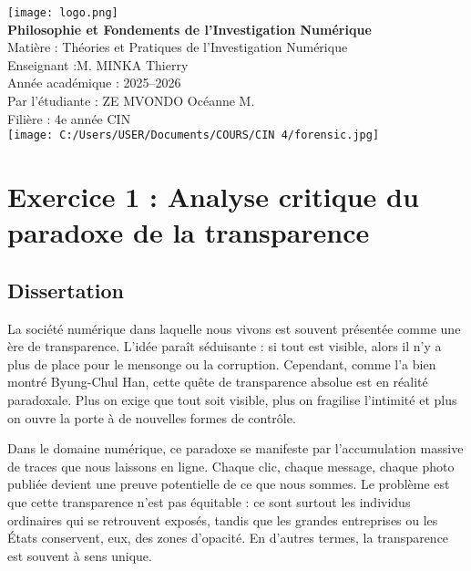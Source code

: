 \documentclass[12pt,a4paper]{report}
\begin{document}
	
	
	\begin{titlepage}
		\centering
		
	
		\texttt{[image: logo.png]}\\[2cm]
		
	
		{\Huge \textbf{Philosophie et Fondements de
				l’Investigation Numérique}}\\[1.5cm]
		
		
		{\Large Matière : Théories et Pratiques de
			l’Investigation Numérique}\\[0.5cm]
		{\Large Enseignant :M. MINKA Thierry}\\[0.5cm]
		{\Large Année académique : 2025--2026}\\[2cm]
		
		
		{\Large  Par l'étudiante : ZE MVONDO Océanne M.}\\[0.5cm]
		{\Large Filière : 4e année CIN }\\[2cm]
		
		
		
	 \texttt{[image: C:/Users/USER/Documents/COURS/CIN 4/forensic.jpg]}\\[4cm]
		
	
	
	\end{titlepage}
	
	
	
	\setlength{\parskip}{1em} 
	\setlength{\parindent}{0pt} 
	
	\section*{Exercice 1 : Analyse critique du paradoxe de la transparence}
	
	\subsection*{Dissertation }
	
	La société numérique dans laquelle nous vivons est souvent présentée comme une ère de 
	transparence. L’idée paraît séduisante : si tout est visible, alors il n’y a plus de place 
	pour le mensonge ou la corruption. Cependant, comme l’a bien montré Byung-Chul Han, 
	cette quête de transparence absolue est en réalité paradoxale. Plus on exige que tout soit 
	visible, plus on fragilise l’intimité et plus on ouvre la porte à de nouvelles formes de contrôle.  
	
	Dans le domaine numérique, ce paradoxe se manifeste par l’accumulation massive de traces 
	que nous laissons en ligne. Chaque clic, chaque message, chaque photo publiée devient une 
	preuve potentielle de ce que nous sommes. Le problème est que cette transparence n’est pas 
	équitable : ce sont surtout les individus ordinaires qui se retrouvent exposés, tandis que 
	les grandes entreprises ou les États conservent, eux, des zones d’opacité. En d’autres termes, 
	la transparence est souvent à sens unique.  
	
\end{document}
